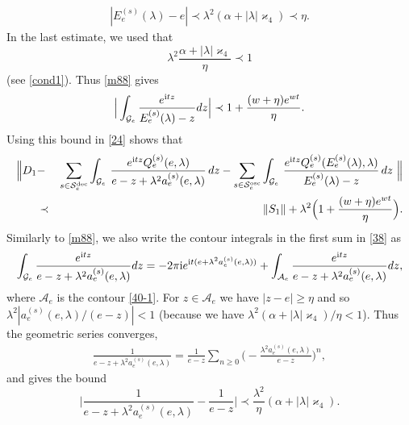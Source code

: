 \documentclass[letterpaper,onecolumn,11pt,accepted=2021-12-09]{quantumarticle}
\numberwithin{equation}{section}
\newcommand{\aes}{a_e^{(s)}}
\newcommand{\Qes}{Q_e^{(s)}}
\newcommand{\Ees}{E_e^{(s)}(\lambda)}
\renewcommand{\i}{{\rm i}}
\begin{document}
\begin{eqnarray}
\label{alphar}
|\Ees-e| \prec \lambda^2 (\alpha+|\lambda| \varkappa_4 ) \prec\eta.
\end{eqnarray}
In the last estimate, we used that 
\begin{equation}
	\label{38.1}
\lambda^2	\frac{\alpha+|\lambda| \varkappa_4}{\eta}\prec 1
\end{equation}
(see \eqref{cond1}). Thus \eqref{m88} gives
\begin{equation}
\label{37.1}
\Big|\int_{{\mathcal G}_e} \frac{e^{\i t z} }{\Ees-z}  d z\Big| \prec   1+ \frac{(w+\eta) e^{wt}}{\eta}. 
\end{equation} 
Using this bound in \eqref{24} shows that 
\begin{eqnarray}
\Big\| D_1 &-& \sum_{s\in{\mathcal S}_e^{\rm dec}} \int_{{\mathcal G}_e}  \,  \frac{e^{\i t z}\Qes(e,\lambda) }{e-z+\lambda^2 \aes(e,\lambda)} \, dz -\sum_{s\in{\mathcal S}_e^{\rm osc}} \int_{{\mathcal G}_e}  \,  \frac{e^{\i t z}\Qes(\Ees,\lambda) }{\Ees-z} \, dz \ \Big\| \nonumber\\
&\prec&  \|S_1\| + \lambda^2\Big(1+\frac{(w+\eta) e^{wt}}{\eta}\Big).
\label{38}
\end{eqnarray}
Similarly to \eqref{m88}, we also write the contour integrals in the first sum in \eqref{38} as
\begin{equation}
\int_{{\mathcal G}_e} \frac{ e^{\i t z}  }{e-z+\lambda^2 \aes(e,\lambda)}dz  =- 2\pi\i e^{\i t (e+\lambda^2 \aes(e,\lambda))} + \int_{{\mathcal A}_e}  \frac{e^{\i t z} }{e-z+\lambda^2 \aes(e,\lambda)}dz,
\label{39}
\end{equation}
where ${\mathcal A}_e$ is the contour \eqref{40-1}. For $z\in{\mathcal A}_e$ we have 
$|z-e|\ge\eta$ and so $\lambda^2|a_e^{(s)}(e,\lambda)/(e-z)|<1$ (because we have  $\lambda^2(\alpha+|\lambda|\varkappa_4)/\eta <1$). Thus the geometric series converges, 
\begin{eqnarray}
\frac{1}{e-z+\lambda^2 \aes(e,\lambda)} =\frac{1}{e-z} \sum_{n\ge 0}\big(-\frac{\lambda^2 a_e^{(s)}(e,\lambda)}{e-z}\big)^n,
\end{eqnarray}
and gives the bound
\begin{equation}
\Big|\frac{1}{e-z+\lambda^2 \aes(e,\lambda)} -\frac{1}{e-z} \Big| \prec \frac{\lambda^2}{\eta}(\alpha+|\lambda|\varkappa_4). 
\end{equation}
\end{document}
